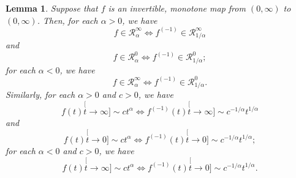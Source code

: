 \documentclass[12pt, a4paper]{amsart}
\newtheorem{lem}[thm]{Lemma}
\theoremstyle{definition}
\numberwithin{equation}{section}
\begin{document}
\begin{lem}
\label{lem: regularly variation and inverse}
	Suppose that $f$ is an invertible, monotone map from $(0,\infty)$ to $(0,\infty)$.
	Then, for each $\alpha > 0$, we have
\[ \label{eq: inverse of a regularly varying function at infinity with alpha > 0}
	f
	\in \mathcal R^\infty_{\alpha}
	\iff f^{(-1)}
	\in \mathcal R^\infty_{1/\alpha}
\]
	and
\[ \label{eq: inverse of a regularly varying function at 0 with alpha > 0}
	f
	\in \mathcal R^0_{\alpha}
	\iff f^{(-1)}
	\in \mathcal R^0_{1/\alpha};
\]
	for each $\alpha < 0$, we have
\[ \label{eq: inverse of a regularly varying function with alpha < 0}
	f
	\in \mathcal R^\infty_{\alpha}
	\iff f^{(-1)}
	\in \mathcal R^0_{1/\alpha}.
\]
	Similarly, for each $\alpha > 0$ and $c > 0$, we have
\[\label{eq: inverse and power equivalent at infinity with alpha > 0}
	f(t)
	\stackrel[t\to \infty]{}{\sim} c t^\alpha
	\iff f^{(-1)}(t)
	\stackrel[t\to \infty]{}{\sim} c^{-1/\alpha} t^{1/\alpha}
\]
	and
\[\label{eq: inverse and power equivalent at 0 with alpha > 0}
	f(t)
	\stackrel[t\to 0]{}{\sim} c t^\alpha
	\iff f^{(-1)}(t)
	\stackrel[t\to 0]{}{\sim} c^{-1/\alpha} t^{1/\alpha};
\]
	for each $\alpha < 0$ and $c > 0$, we have
\[\label{eq: inverse and power equivalent with alpha < 0}
	f(t)
	\stackrel[t\to \infty]{}{\sim} c t^\alpha
	\iff f^{(-1)}(t)
	\stackrel[t\to 0]{}{\sim} c^{-1/\alpha} t^{1/\alpha}.
\]
\end{lem}
\end{document}
